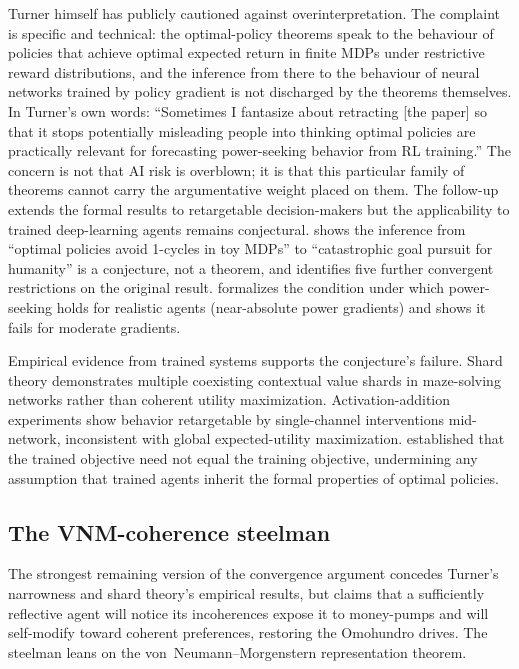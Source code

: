 \documentclass[11pt,a4paper,twocolumn]{article}
\begin{document}
Turner himself has publicly cautioned against overinterpretation.
The complaint is specific and technical: the optimal-policy theorems
speak to the behaviour of policies that achieve optimal expected
return in finite MDPs under restrictive reward distributions, and the
inference from there to the behaviour of neural networks trained by
policy gradient is not discharged by the theorems themselves. In
Turner's own words: ``Sometimes I fantasize about retracting [the
paper] so that it stops potentially misleading people into thinking
optimal policies are practically relevant for forecasting
power-seeking behavior from RL training.'' The concern is not that
AI risk is overblown; it is that this particular family of theorems
cannot carry the argumentative weight placed on them. The follow-up
\citep{turner2022} extends the formal results to retargetable
decision-makers but the applicability to trained deep-learning agents
remains conjectural. \citet{thorstad2024} shows the inference from
``optimal policies avoid 1-cycles in toy MDPs'' to ``catastrophic goal
pursuit for humanity'' is a conjecture, not a theorem, and identifies
five further convergent restrictions on the original result.
\citet{tarsney2025} formalizes the condition under which power-seeking
holds for realistic agents (near-absolute power gradients) and shows it
fails for moderate gradients.

Empirical evidence from trained systems supports the conjecture's
failure. Shard theory \citep{mini2023} demonstrates multiple coexisting
contextual value shards in maze-solving networks rather than coherent
utility maximization. Activation-addition experiments
\citep{turner2023} show behavior retargetable by single-channel
interventions mid-network, inconsistent with global expected-utility
maximization. \citet{hubinger2019} established that the trained objective
need not equal the training objective, undermining any assumption that
trained agents inherit the formal properties of optimal policies.

\subsection{The VNM-coherence steelman}

The strongest remaining version of the convergence argument concedes
Turner's narrowness and shard theory's empirical results, but claims
that a sufficiently reflective agent will notice its incoherences expose
it to money-pumps and will self-modify toward coherent preferences,
restoring the Omohundro drives. The steelman leans on the
von~Neumann--Morgenstern representation theorem.
\end{document}
